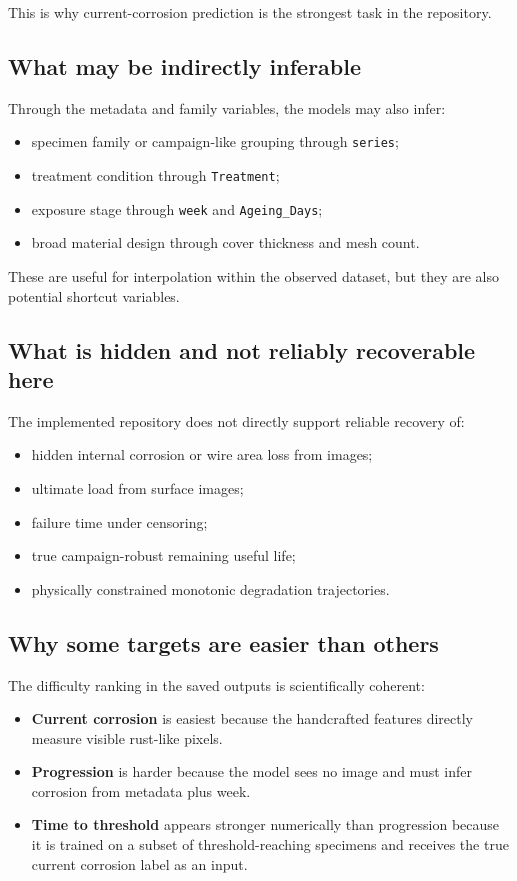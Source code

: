 \documentclass[11pt]{article}
\begin{document}
This is why current-corrosion prediction is the strongest task in the repository.

\subsection{What may be indirectly inferable}
Through the metadata and family variables, the models may also infer:
\begin{itemize}
  \item specimen family or campaign-like grouping through \texttt{series};
  \item treatment condition through \texttt{Treatment};
  \item exposure stage through \texttt{week} and \texttt{Ageing\_Days};
  \item broad material design through cover thickness and mesh count.
\end{itemize}

These are useful for interpolation within the observed dataset, but they are also potential shortcut variables.

\subsection{What is hidden and not reliably recoverable here}
The implemented repository does not directly support reliable recovery of:
\begin{itemize}
  \item hidden internal corrosion or wire area loss from images;
  \item ultimate load from surface images;
  \item failure time under censoring;
  \item true campaign-robust remaining useful life;
  \item physically constrained monotonic degradation trajectories.
\end{itemize}

\subsection{Why some targets are easier than others}
The difficulty ranking in the saved outputs is scientifically coherent:
\begin{itemize}
  \item \textbf{Current corrosion} is easiest because the handcrafted features directly measure visible rust-like pixels.
  \item \textbf{Progression} is harder because the model sees no image and must infer corrosion from metadata plus week.
  \item \textbf{Time to threshold} appears stronger numerically than progression because it is trained on a subset of threshold-reaching specimens and receives the true current corrosion label as an input.
\end{itemize}
\end{document}
